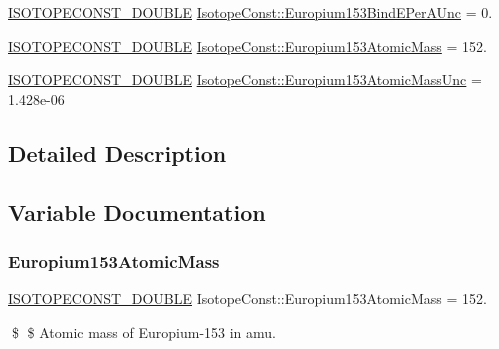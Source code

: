 \begin{DoxyCompactItemize}
\mbox{\hyperlink{group___isotope_const-_macros_ga8f45a7272ce02c0b4c65c44636ed719a}{I\+S\+O\+T\+O\+P\+E\+C\+O\+N\+S\+T\+\_\+\+D\+O\+U\+B\+LE}} \mbox{\hyperlink{group___isotope_const-_europium-_eu153_gaf2f8b5dfc0199e3399fe65510990df9f}{Isotope\+Const\+::\+Europium153\+Bind\+E\+Per\+A\+Unc}} = 0.
\item 
\mbox{\hyperlink{group___isotope_const-_macros_ga8f45a7272ce02c0b4c65c44636ed719a}{I\+S\+O\+T\+O\+P\+E\+C\+O\+N\+S\+T\+\_\+\+D\+O\+U\+B\+LE}} \mbox{\hyperlink{group___isotope_const-_europium-_eu153_ga9c60a575bd4da456babbed5e14c7a110}{Isotope\+Const\+::\+Europium153\+Atomic\+Mass}} = 152.
\item 
\mbox{\hyperlink{group___isotope_const-_macros_ga8f45a7272ce02c0b4c65c44636ed719a}{I\+S\+O\+T\+O\+P\+E\+C\+O\+N\+S\+T\+\_\+\+D\+O\+U\+B\+LE}} \mbox{\hyperlink{group___isotope_const-_europium-_eu153_ga255203ad31e66690d1e49ff1337906c0}{Isotope\+Const\+::\+Europium153\+Atomic\+Mass\+Unc}} = 1.\+428e-\/06
\end{DoxyCompactItemize}


\subsection{Detailed Description}


\subsection{Variable Documentation}
\mbox{\label{group___isotope_const-_europium-_eu153_ga9c60a575bd4da456babbed5e14c7a110}} 
\subsubsection{\texorpdfstring{Europium153\+Atomic\+Mass}{Europium153AtomicMass}}
{\footnotesize\ttfamily \mbox{\hyperlink{group___isotope_const-_macros_ga8f45a7272ce02c0b4c65c44636ed719a}{I\+S\+O\+T\+O\+P\+E\+C\+O\+N\+S\+T\+\_\+\+D\+O\+U\+B\+LE}} Isotope\+Const\+::\+Europium153\+Atomic\+Mass = 152.}

\$ \$ Atomic mass of Europium-\/153 in amu. \mbox{\label{group___isotope_const-_europium-_eu153_ga255203ad31e66690d1e49ff1337906c0}} 
